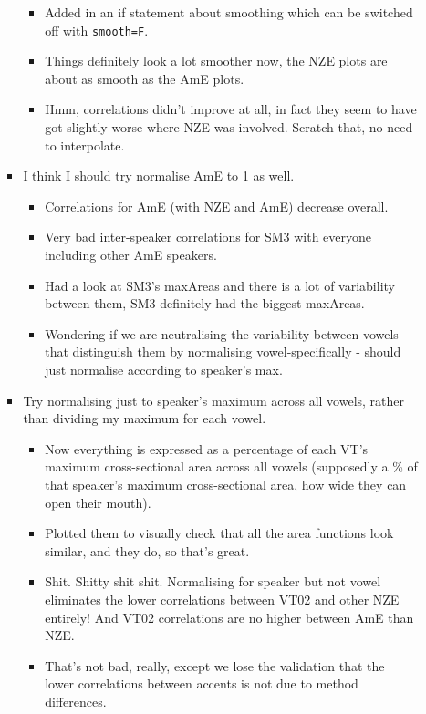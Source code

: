 \documentclass{article}
\begin{document}
\begin{itemize}
\begin{itemize}
\begin{itemize}
\begin{itemize}
                \item Added in an if statement about smoothing which can be switched off with \verb|smooth=F|.
                \item Things definitely look a lot smoother now, the NZE plots are about as smooth as the AmE plots.
                \item Hmm, correlations didn't improve at all, in fact they seem to have got slightly worse where NZE was involved. Scratch that, no need to interpolate.
            \end{itemize}
            \item I think I should try normalise AmE to 1 as well.
            \begin{itemize}
                \item Correlations for AmE (with NZE and AmE) decrease overall.
                \item Very bad inter-speaker correlations for SM3 with everyone including other AmE speakers. \item Had a look at SM3's maxAreas and there is a lot of variability between them, SM3 definitely had the biggest maxAreas.
                \item Wondering if we are neutralising the variability between vowels that distinguish them by normalising vowel-specifically - should just normalise according to speaker's max. 
            \end{itemize}
            \item Try normalising just to speaker's maximum across all vowels, rather than dividing my maximum for each vowel.
            \begin{itemize}
                \item Now everything is expressed as a percentage of each VT's maximum cross-sectional area across all vowels (supposedly a \% of that speaker's maximum cross-sectional area, how wide they can open their mouth).
                \item Plotted them to visually check that all the area functions look similar, and they do, so that's great.
                \item Shit. Shitty shit shit. Normalising for speaker but not vowel eliminates the lower correlations between VT02 and other NZE entirely! And VT02 correlations are no higher between AmE than NZE.
                \item That's not bad, really, except we lose the validation that the lower correlations between accents is not due to method differences.

\end{itemize}
\end{itemize}
\end{itemize}
\end{itemize}
\end{document}
